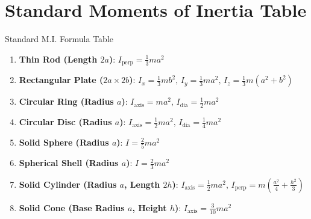 \section{Standard Moments of Inertia Table}

\begin{theorembox}{Standard M.I. Formula Table}
\begin{enumerate}[leftmargin=1.5em]
    \item \textbf{Thin Rod (Length $2a$)}: $I_{\text{perp}} = \frac{1}{3} m a^2$
    \item \textbf{Rectangular Plate ($2a \times 2b$)}: $I_x = \frac{1}{3} m b^2, \, I_y = \frac{1}{3} m a^2, \, I_z = \frac{1}{3} m(a^2 + b^2)$
    \item \textbf{Circular Ring (Radius $a$)}: $I_{\text{axis}} = m a^2, \, I_{\text{dia}} = \frac{1}{2} m a^2$
    \item \textbf{Circular Disc (Radius $a$)}: $I_{\text{axis}} = \frac{1}{2} m a^2, \, I_{\text{dia}} = \frac{1}{4} m a^2$
    \item \textbf{Solid Sphere (Radius $a$)}: $I = \frac{2}{5} m a^2$
    \item \textbf{Spherical Shell (Radius $a$)}: $I = \frac{2}{3} m a^2$
    \item \textbf{Solid Cylinder (Radius $a$, Length $2h$)}: $I_{\text{axis}} = \frac{1}{2} m a^2, \, I_{\text{perp}} = m\left(\frac{a^2}{4} + \frac{h^2}{3}\right)$
    \item \textbf{Solid Cone (Base Radius $a$, Height $h$)}: $I_{\text{axis}} = \frac{3}{10} m a^2$
\end{enumerate}
\end{theorembox}
